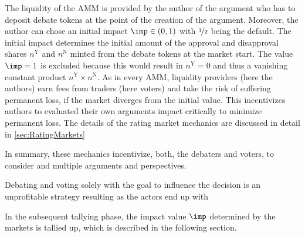 \documentclass[%
aip,
amsmath,amssymb,
reprint,%
unsortedaddress,
nofootinbib
]{revtex4-2}
\newcommand{\Y}{\text{Y}}
\newcommand{\N}{\text{N}}
\begin{document}
The liquidity of the \ac{AMM} is provided by the author of the argument who has to deposit debate tokens at the point of the creation of the argument.
Moreover, the author can chose an initial impact $\imp\in (0,1)$ with $\nicefrac{1}{2}$ being the default.
The initial impact determines the initial amount of the approval and disapproval shares $n^\Y$ and $n^\N$ minted from the debate tokens at the market start.
The value $\imp=1$ is excluded because this would result in $n^\Y=0$ and thus a vanishing constant product $n^\Y\times n^\N$.
As in every \ac{AMM}, liquidity providers (here the authors)
earn fees from traders (here voters)
and 
take the risk of suffering permanent loss, if the market diverges from the initial value.
This incentivizes authors to evaluated their own arguments impact critically 
to minimize permanent loss. 
The details of the rating market mechanics are discussed in detail in \cref{sec:RatingMarkets}

In summary, these mechanics incentivize, both, the debaters and voters, to consider and multiple arguments and perspectives.
 
Debating and voting solely with the goal to influence the decision is an unprofitable  strategy resulting
as the actors end up with 

In the subsequent tallying phase,
the impact value $\imp$ determined by the markets is tallied up,
which is described in the following section.
\end{document}
